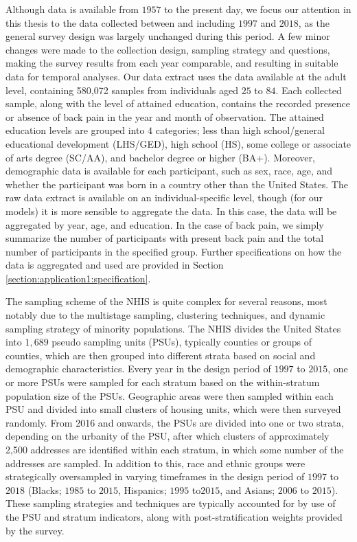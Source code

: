 Although data is available from $1957$ to the present day, we focus our attention in this thesis to the data collected between and including $1997$ and $2018$, as the general survey design was largely unchanged during this period. A few minor changes were made to the collection design, sampling strategy and questions, making the survey results from each year comparable, and resulting in suitable data for temporal analyses. Our data extract uses the data available at the adult level, containing 580,072 samples from individuals aged $25$ to $84$. Each collected sample, along with the level of attained education, contains the recorded presence or absence of back pain in the year and month of observation. The attained education levels are grouped into $4$ categories; less than high school/general
educational development (LHS/GED), high school (HS), some college or associate of arts degree (SC/AA), and bachelor degree or higher (BA+). Moreover, demographic data is available for each participant, such as sex, race, age, and whether the participant was born in a country other than the United States. The raw data extract is available on an individual-specific level, though (for our models) it is more sensible to aggregate the data. In this case, the data will be aggregated by year, age, and education. In the case of back pain, we simply summarize the number of participants with present back pain and the total number of participants in the specified group. Further specifications on how the data is aggregated and used are provided in Section \ref{section:application1:specification}.

The sampling scheme of the NHIS is quite complex for several reasons, most notably due to the multistage sampling, clustering techniques, and dynamic sampling strategy of minority populations. The NHIS divides the United States into $1,689$ pseudo sampling units (PSUs), typically counties or groups of counties, which are then grouped into different strata based on social and demographic characteristics. Every year in the design period of $1997$ to $2015$, one or more PSUs were sampled for each stratum based on the within-stratum population size of the PSUs. Geographic areas were then sampled within each PSU and divided into small clusters of housing units, which were then surveyed randomly. From 2016 and onwards, the PSUs are divided into one or two strata, depending on the urbanity of the PSU, after which clusters of approximately 2,500 addresses are identified within each stratum, in which some number of the addresses are sampled. In addition to this, race and ethnic groups were strategically oversampled in varying timeframes in the design period of $1997$ to $2018$ (Blacks; $1985$ to $2015$, Hispanics; $1995$ to$2015$, and Asians; $2006$ to $2015$). These sampling strategies and techniques are typically accounted for by use of the PSU and stratum indicators, along with post-stratification weights provided by the survey. 

